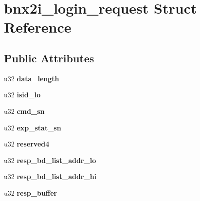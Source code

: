 \hypertarget{structbnx2i__login__request}{
\section{bnx2i\_\-login\_\-request Struct Reference}
\label{structbnx2i__login__request}
}
\subsection*{Public Attributes}
\begin{DoxyCompactItemize}
\item 
\hypertarget{structbnx2i__login__request_a2de69a13efaa0bf73c6d6448c9436553}{
u32 {\bfseries data\_\-length}}
\label{structbnx2i__login__request_a2de69a13efaa0bf73c6d6448c9436553}

\item 
\hypertarget{structbnx2i__login__request_ab205355a2bfe7859cd049e4e94721c13}{
u32 {\bfseries isid\_\-lo}}
\label{structbnx2i__login__request_ab205355a2bfe7859cd049e4e94721c13}

\item 
\hypertarget{structbnx2i__login__request_a81a7671b9e7430a5e68f3735650c6fdb}{
u32 {\bfseries cmd\_\-sn}}
\label{structbnx2i__login__request_a81a7671b9e7430a5e68f3735650c6fdb}

\item 
\hypertarget{structbnx2i__login__request_ac6e59638cad78fb50354f3f524cc9272}{
u32 {\bfseries exp\_\-stat\_\-sn}}
\label{structbnx2i__login__request_ac6e59638cad78fb50354f3f524cc9272}

\item 
\hypertarget{structbnx2i__login__request_a4df3146f1813f7cac316788f44f1d7e2}{
u32 {\bfseries reserved4}}
\label{structbnx2i__login__request_a4df3146f1813f7cac316788f44f1d7e2}

\item 
\hypertarget{structbnx2i__login__request_a308abaff3f7eb3565b93516591e4aa2c}{
u32 {\bfseries resp\_\-bd\_\-list\_\-addr\_\-lo}}
\label{structbnx2i__login__request_a308abaff3f7eb3565b93516591e4aa2c}

\item 
\hypertarget{structbnx2i__login__request_ab72f5683783d502d22a0c95a2f93f6fa}{
u32 {\bfseries resp\_\-bd\_\-list\_\-addr\_\-hi}}
\label{structbnx2i__login__request_ab72f5683783d502d22a0c95a2f93f6fa}

\item 
\hypertarget{structbnx2i__login__request_ac78e02adb3836d3fe78471bdc541f519}{
u32 {\bfseries resp\_\-buffer}}
\label{structbnx2i__login__request_ac78e02adb3836d3fe78471bdc541f519}


\end{DoxyCompactItemize}
